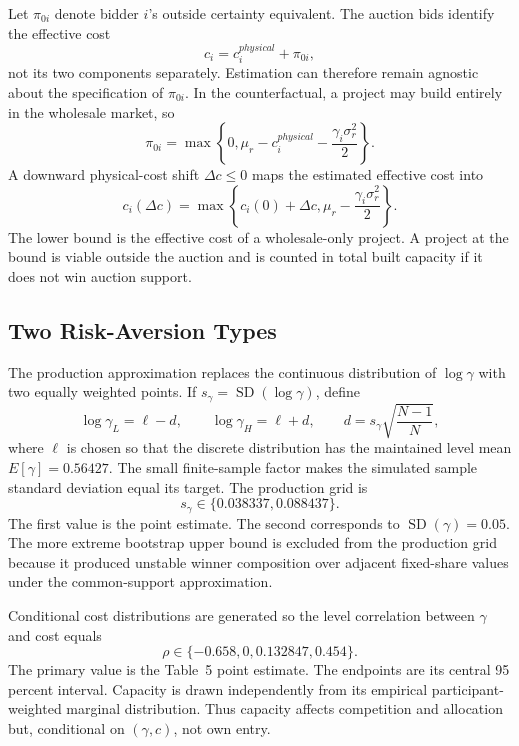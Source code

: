 \documentclass[10pt]{article}
\begin{document}
Let $\pi_{0i}$ denote bidder $i$'s outside certainty equivalent.  The auction
bids identify the effective cost
\begin{equation}
c_i=c_i^{physical}+\pi_{0i},
\label{eq:effective_cost}
\end{equation}
not its two components separately.  Estimation can therefore remain agnostic
about the specification of $\pi_{0i}$.  In the counterfactual, a project may
build entirely in the wholesale market, so
\begin{equation}
\pi_{0i}
=\max\left\{0,\mu_r-c_i^{physical}
-\frac{\gamma_i\sigma_r^2}{2}\right\}.
\end{equation}
A downward physical-cost shift $\Delta c\leq0$ maps the estimated effective
cost into
\begin{equation}
c_i(\Delta c)
=\max\left\{c_i(0)+\Delta c,
\mu_r-\frac{\gamma_i\sigma_r^2}{2}\right\}.
\label{eq:cost_floor}
\end{equation}
The lower bound is the effective cost of a wholesale-only project.  A project
at the bound is viable outside the auction and is counted in total built
capacity if it does not win auction support.

\subsection{Two Risk-Aversion Types}

The production approximation replaces the continuous distribution of
$\log\gamma$ with two equally weighted points.  If
$s_\gamma=\operatorname{SD}(\log\gamma)$, define
\begin{equation}
\log\gamma_L=\ell-d,
\qquad
\log\gamma_H=\ell+d,
\qquad
d=s_\gamma\sqrt{\frac{N-1}{N}},
\end{equation}
where $\ell$ is chosen so that the discrete distribution has the maintained
level mean $E[\gamma]=0.56427$.  The small finite-sample factor makes the
simulated sample standard deviation equal its target.  The production grid is
\begin{equation}
s_\gamma\in\{0.038337,0.088437\}.
\label{eq:gamma_grid}
\end{equation}
The first value is the point estimate.  The second corresponds to
$\operatorname{SD}(\gamma)=0.05$.  The more extreme bootstrap upper bound is
excluded from the production grid because it produced unstable winner
composition over adjacent fixed-share values under the common-support
approximation.

Conditional cost distributions are generated so the level correlation
between $\gamma$ and cost equals
\begin{equation}
\rho\in\{-0.658,0,0.132847,0.454\}.
\label{eq:rho_grid}
\end{equation}
The primary value is the Table~5 point estimate.  The endpoints are its
central 95 percent interval.  Capacity is drawn independently from its
empirical participant-weighted marginal distribution.  Thus capacity affects
competition and allocation but, conditional on $(\gamma,c)$, not own entry.
\end{document}

